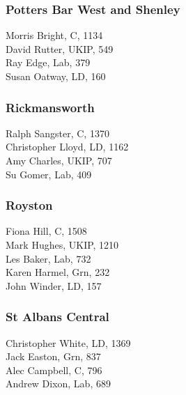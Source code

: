 \documentclass[a4paper,openany,10pt]{book}
\begin{document}
\subsubsection*{Potters Bar West and Shenley}



Morris Bright, C, 1134\\
David Rutter, UKIP, 549\\
Ray Edge, Lab, 379\\
Susan Oatway, LD, 160\\


\subsubsection*{Rickmansworth}



Ralph Sangster, C, 1370\\
Christopher Lloyd, LD, 1162\\
Amy Charles, UKIP, 707\\
Su Gomer, Lab, 409\\


\subsubsection*{Royston}



Fiona Hill, C, 1508\\
Mark Hughes, UKIP, 1210\\
Les Baker, Lab, 732\\
Karen Harmel, Grn, 232\\
John Winder, LD, 157\\


\subsubsection*{St Albans Central}



Christopher White, LD, 1369\\
Jack Easton, Grn, 837\\
Alec Campbell, C, 796\\
Andrew Dixon, Lab, 689\\
\end{document}
